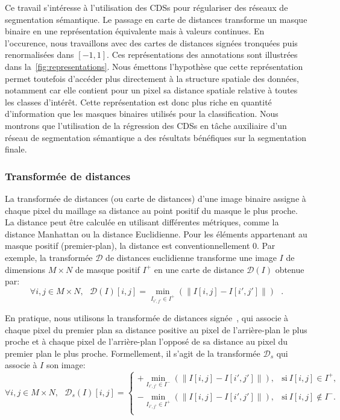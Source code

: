 Ce travail s'intéresse à l'utilisation des \glspl{CDS} pour régulariser des réseaux de segmentation sémantique. Le passage en carte de distances transforme un masque binaire en une représentation équivalente mais à valeurs continues. En l'occurence, nous travaillons avec des cartes de distances signées tronquées puis renormalisées dans $[-1,1]$. Ces représentations des annotations sont illustrées dans la~\cref{fig:representations}. Nous émettons l'hypothèse que cette représentation permet toutefois d'accéder plus directement à la structure spatiale des données, notamment car elle contient pour un pixel sa distance spatiale relative à toutes les classes d'intérêt. Cette représentation est donc plus riche en quantité d'information que les masques binaires utilisés pour la classification. Nous montrons que l'utilisation de la régression des \glspl{CDS} en tâche auxiliaire d'un réseau de segmentation sémantique a des résultats bénéfiques sur la segmentation finale.

\subsubsection{Transformée de distances}

La transformée de distances (ou carte de distances) d'une image binaire assigne à chaque pixel du maillage sa distance au point positif du masque le plus proche. La distance peut être calculée en utilisant différentes métriques, comme la distance Manhattan ou la distance Euclidienne. Pour les éléments appartenant au masque positif (premier-plan), la distance est conventionnellement 0. Par exemple, la transformée $\mathcal{D}$ de distances euclidienne transforme une image $I$ de dimensions $M\times N$ de masque positif $I^+$ en une carte de distance $\mathcal{D}(I)$ obtenue par:
\begin{equation}
  \forall i,j \in M\times N, ~~~\mathcal{D}(I)[i,j] = \min_{I_{i',j'} \in I^+} (\parallel I[i,j] - I[i',j'] \parallel)~~~.
\end{equation}

En pratique, nous utilisons la transformée de distances signée~\cite{q._z._ye_signed_1988}, qui associe à chaque pixel du premier plan sa distance positive au pixel de l'arrière-plan le plus proche et à chaque pixel de l'arrière-plan l'opposé de sa distance au pixel du premier plan le plus proche. Formellement, il s'agit de la transformée $\mathcal{D}_s$ qui associe à $I$ son image:
\begin{equation}
\forall i,j \in M\times N,~~~\mathcal{D}_s(I)[i,j] =
\begin{cases}
+ \min_{I_{i',j'} \in I^-} (\parallel I[i,j] - I[i',j'] \parallel), & \text{si}~I[i,j] \in I^+,\\
- \min_{I_{i',j'} \in I^+} (\parallel I[i,j] - I[i',j'] \parallel), & \text{si}~I[i,j] \notin I^-.\\
\end{cases}
\end{equation}

